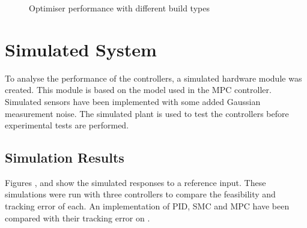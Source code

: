 \documentclass[11pt,a4paper]{article}
\begin{document}
\begin{figure}[hbt!]
    \centering
    \caption{Optimiser performance with different build types}
    \label{fig:optimiser_process_time}
\end{figure}


\clearpage
\section{Simulated System}
\label{sub:simulated_system}
To analyse the performance of the controllers, a simulated hardware module was created. This module is based on the \cite{hosovsky_2012} model used in the MPC controller. Simulated sensors have been implemented with some added Gaussian measurement noise. The simulated plant is used to test the controllers before experimental tests are performed.

\subsection{Simulation Results}
\label{sub:simulation_results}
Figures ,  and  show the simulated responses to a reference input. These simulations were run with three controllers to compare the feasibility and tracking error of each. An implementation of PID, SMC and MPC have been compared with their tracking error on .
\end{document}
